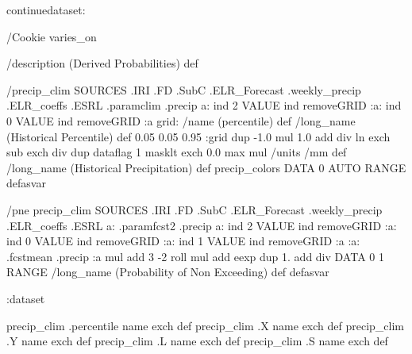 \begin{ingrid}

continuedataset:


/Cookie varies_on

/description (Derived Probabilities) def

/precip_clim {
SOURCES .IRI .FD .SubC .ELR_Forecast .weekly_precip .ELR_coeffs .ESRL
  .paramclim .precip
   a:
     ind 2 VALUE
     ind removeGRID
     :a:
      ind 0 VALUE
      ind removeGRID
      :a
    grid:
      /name (percentile) def
      /long_name (Historical Percentile) def
      0.05 0.05 0.95 :grid
     dup
      -1.0 mul
      1.0 add
      div
     ln exch sub
    exch div
   dup dataflag
    1 masklt
    exch
    0.0 max
    mul
/units /mm def
/long_name (Historical Precipitation) def
precip_colors
DATA 0 AUTO RANGE
}defasvar

/pne{
precip_clim
SOURCES .IRI .FD .SubC .ELR_Forecast .weekly_precip .ELR_coeffs .ESRL
   a: .paramfcst2 .precip
    a:
      ind 2 VALUE
      ind removeGRID
      :a:
       ind 0 VALUE
       ind removeGRID
       :a:
        ind 1 VALUE
        ind removeGRID
        :a
      :a: .fcstmean .precip :a mul
      add
     3 -2 roll
     mul
    add
   eexp
   dup
    1. add
    div
   DATA 0 1 RANGE
  /long_name (Probability of Non Exceeding) def
}defasvar

:dataset

precip_clim .percentile name exch def
precip_clim .X name exch def
precip_clim .Y name exch def
precip_clim .L name exch def
precip_clim .S name exch def

\end{ingrid}

